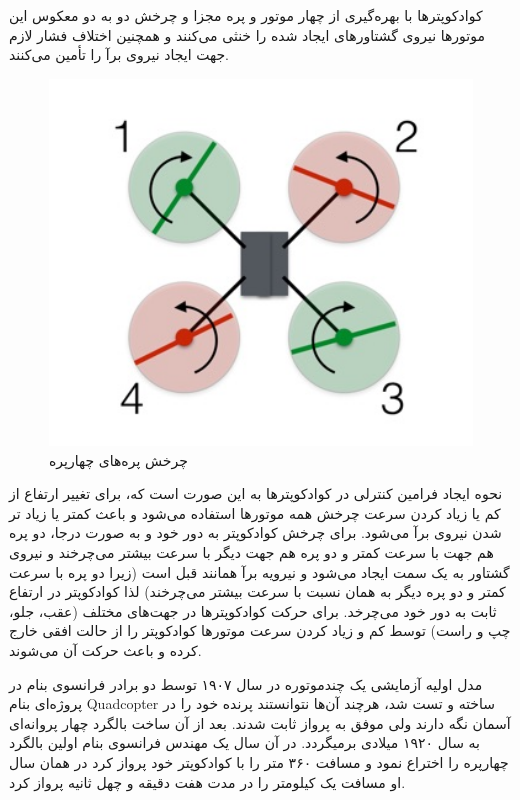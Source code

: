 کوادکوپترها با بهره‌گیری از چهار موتور و پره مجزا و چرخش دو به دو معکوس این موتورها نیروی گشتاورهای ایجاد شده را خنثی می‌کنند و همچنین اختلاف فشار لازم جهت ایجاد نیروی برآ را تأمین می‌کنند.

\begin{figure}[H]
	\includegraphics[width=12cm]{figs/introduction/Quadblade.jpg}
	\centering
	\caption{چرخش پره‌های چهارپره\cite{Quadhowfly}}
\end{figure}
نحوه ایجاد فرامین کنترلی در کوادکوپترها به این صورت است که، برای تغییر ارتفاع از کم یا زیاد کردن سرعت چرخش همه موتورها استفاده می‌شود و باعث کمتر یا زیاد تر شدن نیروی برآ می‌شود. برای چرخش کوادکوپتر به دور خود و به صورت درجا، دو پره هم جهت با سرعت کمتر و دو پره هم جهت دیگر با سرعت بیشتر می‌چرخند و نیروی گشتاور به یک سمت ایجاد می‌شود و نیرویه برآ همانند قبل است (زیرا دو پره با سرعت کمتر و دو پره دیگر به همان نسبت با سرعت بیشتر می‌چرخند) لذا کوادکوپتر در ارتفاع ثابت به دور خود می‌چرخد. برای حرکت کوادکوپترها در جهت‌های مختلف (عقب، جلو، چپ و راست) توسط کم و زیاد کردن سرعت موتورها کوادکوپتر را از حالت افقی خارج کرده و باعث حرکت آن می‌شوند.

مدل‬ اولیه آزمایشی یک چندموتوره در سال ۱۹۰۷ توسط دو برادر فرانسوی بنام  در پروژه‌ای بنام Quadcopter ساخته و تست شد، هرچند آن‌ها نتوانستند پرنده خود را در آسمان نگه دارند ولی موفق به پرواز ثابت شدند. بعد از آن ساخت بالگرد چهار پروانه‌ای به سال ۱۹۲۰ میلادی برمیگردد. در آن سال یک مهندس فرانسوی بنام  اولین بالگرد چهارپره را اختراع نمود و مسافت ۳۶۰ متر را با کوادکوپتر خود پرواز کرد در همان سال او مسافت یک کیلومتر را در مدت هفت دقیقه و چهل ثانیه پرواز کرد.

